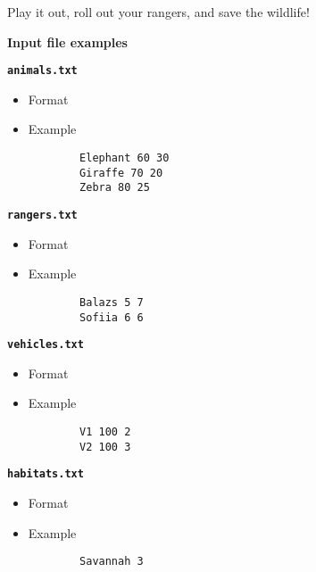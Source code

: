 \documentclass[a4paper,12pt]{article}
\begin{document}
Play it out, roll out your rangers, and save the wildlife!

\bigskip

\textbf{Input file examples}

\textbf{\texttt{animals.txt}}
\begin{itemize}
    \item Format
    \newline {}
    \item Example
    \begin{verbatim}
        Elephant 60 30
        Giraffe 70 20
        Zebra 80 25
    \end{verbatim}
\end{itemize}

\textbf{\texttt{rangers.txt}}
\begin{itemize}
    \item Format
    \newline {}
    \item Example
    \begin{verbatim}
        Balazs 5 7
        Sofiia 6 6
    \end{verbatim}
\end{itemize}

\textbf{\texttt{vehicles.txt}}
\begin{itemize}
    \item Format
    \newline {}
    \item Example
    \begin{verbatim}
        V1 100 2
        V2 100 3
    \end{verbatim}
\end{itemize}

\textbf{\texttt{habitats.txt}}
\begin{itemize}
    \item Format
    \newline {}
    \item Example
    \begin{verbatim}
        Savannah 3
    \end{verbatim}
\end{itemize}
\end{document}
